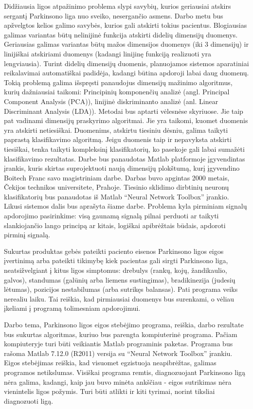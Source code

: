 \documentclass[]{vgtuef}
\begin{document}
Didžiausia ligos atpažinimo problema slypi savybių, kurios geriausiai
atskirs sergantį Parkinsono liga nuo sveiko, nesergančio asmens. Darbo
metu bus apžvelgtos kelios galimo savybės, kurios gali atskirti tokius
pacientus. Blogiausias galimas variantas būtų nelinijinė funkcija
atskirti didelių dimensijų duomenys. Geriausias galimas variantas būtų
mažos dimensijos duomenys (iki 3 dimensijų) ir linijiškai atskiriami
duomenys (kadangi linijinę funkciją realizuoti yra
lengviausia). Turint didelių dimensijų duomenis, planuojamos sistemos
aparatiniai reikalavimai automatiškai padidėja, kadangi būtina
apdoroji labai daug duomenų. Tokią problemą galima išspręsti
panaudojus dimensijų mažinimo algoritmus, kurių dažniausiai taikomi:
Principinių komponenčių analizė (angl. Principal Component Analysis
(PCA)), linijinė diskriminanto analizė (anl. Linear Discriminant
Analysis (LDA)). Metodai bus aptarti vėlesnėse skyriuose. Jie taip pat
vadinami dimensijų praskyrimo algoritmai. Jie yra taikomi, kuomet
duomenis yra atskirti netiesiškai. Duomenims, atskirtu tiesiniu
dėsniu, galima taikyti paprastą klasifikavimo algoritmą. Jeigu
duomenis taip ir nepavyksta atskirti tiesiškai, tenka taikyti
kompleksinį klasifikatorių, ko pasekoje gali labai sumažėti
klasifikavimo rezultatas. Darbe bus panaudotas Matlab platformoje
įgyvendintas įrankis, kuris skirtas suprojektuoti naują dimensijų
plokštumą, kurį įgyvendino Boitech Franc savo magistriniam
darbe. Darbas buvo apgintas 2000 metais, Čekijos technikos
universitete, Prahoje. Tiesinio sklidimo dirbtinių neuronų
klasifikatorių bus panaudotas iš Matlab ``Neural Network Toolbox''
įrankio. Likusi sistemos dalis bus aprašyta šiame darbe. Problema kyla
pirminiam signalų apdorojimo pasirinkime: visą gaunamą signalą pilnai
perduoti ar taikyti slankiojančio lango principą ar kitais, logiškai
apibrėžtais būdais, apdoroti pirminį signalą.

Sukurtas produktas gebės pateikti paciento eisenos Parkinsono ligos
eigos įvertinimą arba pateikti tikimybę kiek pacientas gali sirgti
Parkinsono liga, neatsižvelgiant į kitus ligos simptomus: drebulys
(rankų, kojų, žandikaulio, galvos), standumas (galūnių arba liemens
sustingimas), bradikinezija (judesių lėtumas), pozicijos nestabilumas
(arba sutrikęs balansas). Pati programa veiks nerealiu laiku. Tai
reiškia, kad pirmiausiai duomenys bus surenkami, o vėliau įkeliami į
programą tolimesniam apdorojimui.

Darbo tema, Parkinsono ligos eigos stebėjimo programa, reiškia, darbo
rezultate bus sukurtas algoritmas, kuriuo bus parengta kompiuterinė
programa. Pačiam kompiuteryje turi būti veikiantis Matlab programinis
paketas. Programa bus rašoma Matlab 7.12.0 (R2011) versija su ``Neural
Network Toolbox'' įrankiu. Eigos stebėjimas reiškia, kad visuomet
egzistuoja neapibrėžtas, galimas programos netikslumas. Visiškai
programa remtis, diagnozuojant Parkinsono ligą nėra galima, kadangi,
kaip jau buvo minėta ankščiau - eigos sutrikimas nėra vienintelis
ligos požymis. Turi būti atlikti ir kiti tyrimai, norint tiksliai
diagnozuoti ligą.
\end{document}

